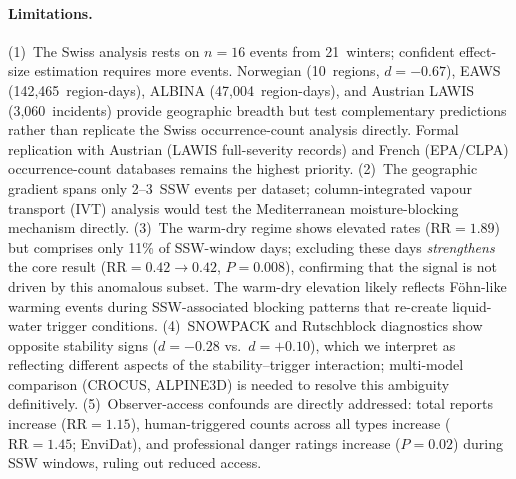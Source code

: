\documentclass[11pt,letterpaper]{article}
\begin{document}
\paragraph{Limitations.} (1)~The Swiss analysis rests on $n = 16$ events from 21~winters; confident effect-size estimation requires more events. Norwegian (10~regions, $d = -0.67$), EAWS (142,465~region-days), ALBINA (47,004~region-days), and Austrian LAWIS (3,060~incidents) provide geographic breadth but test complementary predictions rather than replicate the Swiss occurrence-count analysis directly. Formal replication with Austrian (LAWIS full-severity records) and French (EPA/CLPA) occurrence-count databases remains the highest priority. (2)~The geographic gradient spans only 2--3~SSW events per dataset; column-integrated vapour transport (IVT) analysis would test the Mediterranean moisture-blocking mechanism directly. (3)~The warm-dry regime shows elevated rates ($\mathrm{RR} = 1.89$) but comprises only 11\% of SSW-window days; excluding these days \emph{strengthens} the core result ($\mathrm{RR} = 0.42 \to 0.42$, $P = 0.008$), confirming that the signal is not driven by this anomalous subset. The warm-dry elevation likely reflects Föhn-like warming events during SSW-associated blocking patterns that re-create liquid-water trigger conditions. (4)~SNOWPACK and Rutschblock diagnostics show opposite stability signs ($d = -0.28$ vs.\ $d = +0.10$), which we interpret as reflecting different aspects of the stability--trigger interaction; multi-model comparison (CROCUS, ALPINE3D) is needed to resolve this ambiguity definitively. (5)~Observer-access confounds are directly addressed: total reports increase ($\mathrm{RR} = 1.15$), human-triggered counts across all types increase ($\mathrm{RR} = 1.45$; EnviDat), and professional danger ratings increase ($P = 0.02$) during SSW windows, ruling out reduced access.
\end{document}
